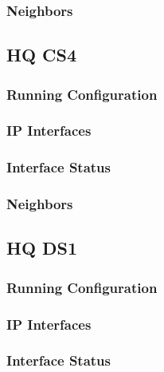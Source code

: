 \subsubsection{Neighbors}


\subsection{HQ CS4}
\subsubsection{Running Configuration}


\subsubsection{IP Interfaces}


\subsubsection{Interface Status}


\subsubsection{Neighbors}


\subsection{HQ DS1}
\subsubsection{Running Configuration}


\subsubsection{IP Interfaces}


\subsubsection{Interface Status}


